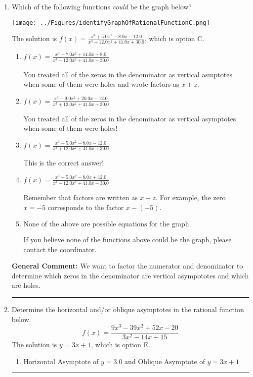 \documentclass{extbook}[14pt]
\newcommand{\litem}[1]{\item #1

\rule{\textwidth}{0.4pt}}
\begin{document}
\begin{enumerate}\litem{
Which of the following functions \textit{could} be the graph below?

\begin{center}
    \texttt{[image: ../Figures/identifyGraphOfRationalFunctionC.png]}
\end{center}


The solution is \( f(x)=\frac{x^{3} +5.0 x^{2} -8.0 x -12.0}{x^{3} +12.0 x^{2} +41.0 x + 30.0} \), which is option C.\begin{enumerate}[label=\Alph*.]
\item \( f(x)=\frac{x^{3} +7.0 x^{2} +14.0 x + 8.0}{x^{3} -12.0 x^{2} +41.0 x -30.0} \)

You treated all of the zeros in the denominator as vertical asmptotes when some of them were holes and wrote factors as $x+z$.
\item \( f(x)=\frac{x^{3} -9.0 x^{2} +20.0 x -12.0}{x^{3} +12.0 x^{2} +41.0 x + 30.0} \)

You treated all of the zeros in the denominator as vertical asymptotes when some of them were holes!
\item \( f(x)=\frac{x^{3} +5.0 x^{2} -8.0 x -12.0}{x^{3} +12.0 x^{2} +41.0 x + 30.0} \)

This is the correct answer!
\item \( f(x)=\frac{x^{3} -5.0 x^{2} -8.0 x + 12.0}{x^{3} -12.0 x^{2} +41.0 x -30.0} \)

Remember that factors are written as $x-z$. For example, the zero $x=-5$ corresponds to the factor $x-(-5)$.
\item \( \text{None of the above are possible equations for the graph.} \)

If you believe none of the functions above could be the graph, please contact the coordinator.
\end{enumerate}

\textbf{General Comment:} We want to factor the numerator and denominator to determine which zeros in the denominator are vertical asympototes and which are holes.
}
\litem{
Determine the horizontal and/or oblique asymptotes in the rational function below.
\[ f(x) = \frac{9x^{3} -39 x^{2} +52 x -20}{3x^{2} -14 x + 15} \]The solution is \( y = 3x + 1 \), which is option E.\begin{enumerate}[label=\Alph*.]
\item \( \text{Horizontal Asymptote of } y = 3.0 \text{ and Oblique Asymptote of } y = 3x + 1 \)


\end{enumerate}}
\end{enumerate}
\end{document}
